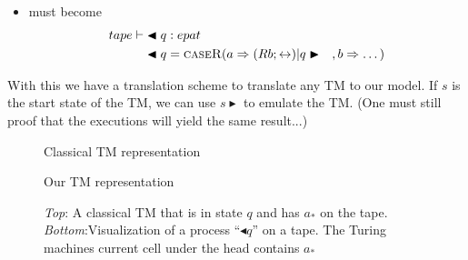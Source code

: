 \documentclass{article}
\begin{document}
\begin{enumerate}
\begin{itemize}
			\item {} must become  
			\begin{align*}
			tape \vdash &\blacktriangleleft q : epat \\
			&\blacktriangleleft q = \textsc{caseR}( a \Rightarrow (Rb;\leftrightarrow) \vert q \blacktriangleright \quad, b \Rightarrow \dots ) 
			\end{align*}
		\end{itemize}
	\end{enumerate}
	
	
	With this we have a translation scheme to translate any TM to our model.
	If \(s\) is the start state of the TM, we can use \(s \blacktriangleright\) to emulate the TM.
	(One must still proof that the executions will yield the same result...)
	
	
	
	\begin{figure}
		\centering
		{\footnotesize Classical TM representation}
		
		\vspace{3em}
		
		
		{\footnotesize Our TM representation}
		\caption{\textit{Top}: A classical TM that is in state \(q\) and has \(a_*\) on the tape. \textit{Bottom}:Visualization of a process ``$\blacktriangleleft q$'' on a tape. The Turing machines current cell under the head contains \(a_*\)}
	\end{figure}
	
\end{document}
